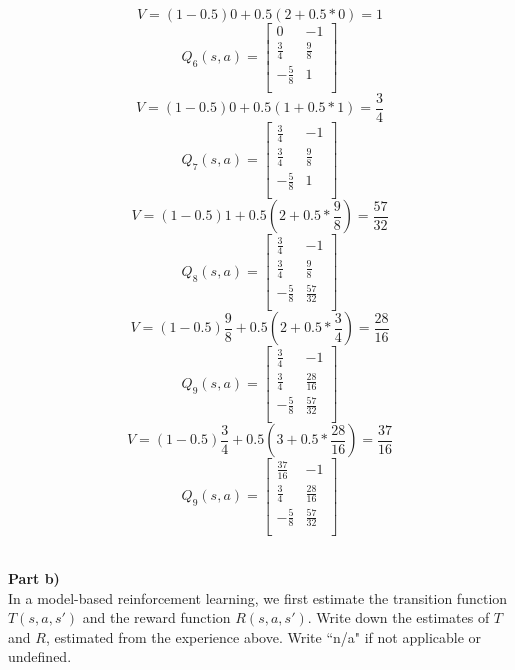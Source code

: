 \documentclass[12pt,letter]{article}
\newcommand{\ppart}[1]{\vspace{2mm}\large\textbf{\\Part {#1})\vspace{2mm}}\normalsize\\}
\begin{document}
\begin{multicols}{2}
\[\]
\[
    V = (1-0.5)0 + 0.5(2 + 0.5*0)=1
\]
\[
    Q_6(s,a) = 
    \begin{bmatrix}
        0 & -1\\
        \frac34 & \frac98\\
        -\frac58 & 1\\
    \end{bmatrix}
\]
\[
    V = (1-0.5)0 + 0.5(1 + 0.5*1)=\frac34
\]
\[
    Q_7(s,a) = 
    \begin{bmatrix}
        \frac34 & -1\\
        \frac34 & \frac98\\
        -\frac58 & 1\\
    \end{bmatrix}
\]
\[
    V = (1-0.5)1 + 0.5(2 + 0.5*\frac98)=\frac{57}{32}
\]
\[
    Q_8(s,a) = 
    \begin{bmatrix}
        \frac34 & -1\\
        \frac34 & \frac98\\
        -\frac58 & \frac{57}{32}\\
    \end{bmatrix}
\]
\[
    V = (1-0.5)\frac98 + 0.5(2 + 0.5*\frac34)=\frac{28}{16}
\]
\[
    Q_9(s,a) = 
    \begin{bmatrix}
        \frac34 & -1\\
        \frac34 & \frac{28}{16}\\
        -\frac58 & \frac{57}{32}\\
    \end{bmatrix}
\]
\[
    V = (1-0.5)\frac34 + 0.5(3 + 0.5*\frac{28}{16})=\frac{37}{16}
\]
\[
    Q_9(s,a) = 
    \begin{bmatrix}
        \frac{37}{16} & -1\\
        \frac34 & \frac{28}{16}\\
        -\frac58 & \frac{57}{32}\\
    \end{bmatrix}
\]
\end{multicols}

\ppart{b}
In a model-based reinforcement learning, we first estimate the transition function
$T(s,a,s')$ and the reward function $R(s,a,s')$. Write down the estimates of
$T$ and $R$, estimated from the experience above. Write ``n/a" if not 
applicable or undefined. 
\end{document}
